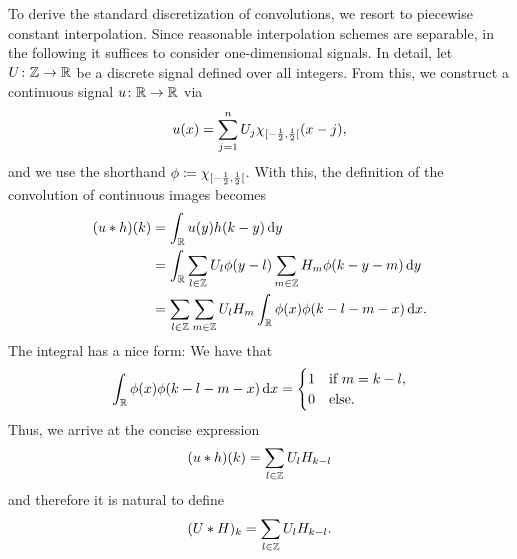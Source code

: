 To derive the standard discretization of convolutions, we resort to piecewise constant interpolation.
Since reasonable interpolation schemes are separable, in the following it suffices to consider one-dimensional signals.
In detail, let \( U \colon \mathbb{Z} \to \mathbb{R} \) be a discrete signal defined over all integers.
From this, we construct a continuous signal \( u \colon \mathbb{R} \to \mathbb{R} \) via
\begin{equation}
	u(x) = \sum_{j=1}^n U_j \CharacteristicFunction{\rinterval{-\frac{1}{2}}{\frac{1}{2}}}(x - j),
\end{equation}
and we use the shorthand \( \phi \coloneqq \CharacteristicFunction{\rinterval{-\frac{1}{2}}{\frac{1}{2}}} \).
With this, the definition of the convolution of continuous images becomes
\begin{equation}
	\begin{aligned}
		(u \ast h)(k) &= \int_{\mathbb{R}} u(y)h(k-y)\,\mathrm{d}y \\
										&= \int_{\mathbb{R}}\sum_{l\in\mathbb{Z}}U_l\phi(y - l) \sum_{m \in \mathbb{Z}} H_m\phi(k - y - m)\,\mathrm{d}y\\
										&= \sum_{l\in\mathbb{Z}} \sum_{m\in\mathbb{Z}} U_l H_m \int_{\mathbb{R}} \phi(x)\phi(k - l - m - x)\,\mathrm{d}x.
	\end{aligned}
\end{equation}
The integral has a nice form:
We have that
\begin{equation}
	\int_{\mathbb{R}} \phi(x)\phi(k-l-m-x)\,\mathrm{d}x = \begin{cases}
		\num{1} & \text{if}\ m = k - l,\\
		\num{0} & \text{else}.
	\end{cases}
\end{equation}
Thus, we arrive at the concise expression
\begin{equation}
	(u \ast h)(k) = \sum_{l\in\mathbb{Z}} U_l H_{k-l}
\end{equation}
and therefore it is natural to define
\begin{equation}
	(U \ast H)_k = \sum_{l \in \mathbb{Z}} U_l H_{k-l}.
\end{equation}

